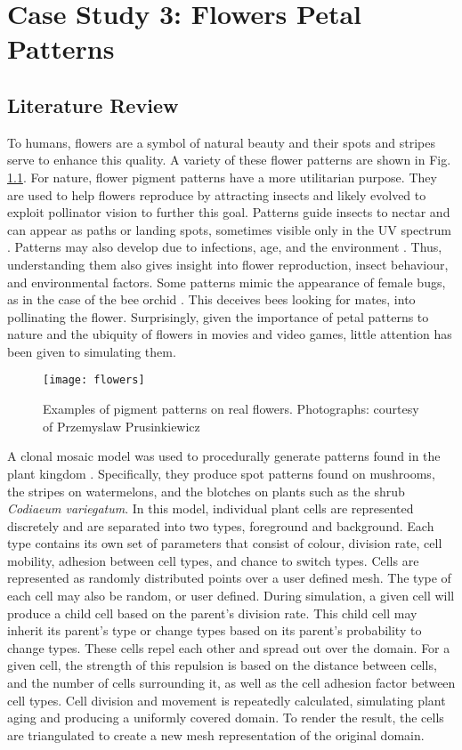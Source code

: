 \chapter{Case Study 3: Flowers Petal Patterns}

\section{Literature Review}
To humans, flowers are a symbol of natural beauty and their spots and stripes serve to enhance this quality. A variety of these flower patterns are shown in Fig. \ref{fig:realFlowers}. For nature, flower pigment patterns have a more  utilitarian purpose. They are used to help flowers reproduce by attracting insects and likely evolved to exploit pollinator vision to further this goal. Patterns guide insects to nectar and can appear as paths or landing spots, sometimes visible only in the UV spectrum \citep{Davies2012}. Patterns may also develop due to infections, age, and the environment \citep{Davies2012, ROBINSON2015}. Thus, understanding them also gives insight into flower reproduction, insect behaviour, and environmental factors. Some patterns mimic the appearance of female bugs, as in the case of the bee orchid \citep{Vereecken7484}. This deceives bees looking for mates, into pollinating the flower. Surprisingly, given the importance of petal patterns to nature and the ubiquity of flowers in movies and video games, little attention has been given to simulating them. 

\begin{figure}[!ht]
	\centering
	\texttt{[image: flowers]}
	\caption{Examples of pigment patterns on real flowers. \textcolor{citation-gray}{Photographs: courtesy of Przemyslaw Prusinkiewicz}}
	\label{fig:realFlowers}
\end{figure}
A clonal mosaic model was used to procedurally generate patterns found in the plant kingdom \citep{binsfeld2011}. Specifically, they produce spot patterns found on mushrooms, the stripes on watermelons, and the blotches on plants such as the shrub \textit{Codiaeum variegatum}. In this model, individual plant cells are represented discretely and are separated into two types, foreground and background. Each type contains its own set of parameters that consist of colour, division rate, cell mobility, adhesion between cell types, and chance to switch types. Cells are represented as randomly distributed points over a user defined mesh. The type of each cell may also be random, or user defined. During simulation, a given cell will produce a child cell based on the parent's division rate. This child cell may inherit its parent's type or change types based on its parent's probability to change types. These cells repel each other and spread out over the domain. For a given cell, the strength of this repulsion is based on the distance between cells, and the number of cells surrounding it, as well as the cell adhesion factor between cell types. Cell division and movement is repeatedly calculated, simulating plant aging and producing a uniformly covered domain. To render the result, the cells are triangulated to create a new mesh representation of the original domain. 

